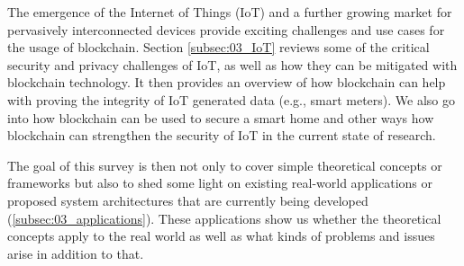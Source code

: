 The emergence of the Internet of Things (IoT) and a further growing market for pervasively interconnected devices provide exciting challenges and use cases for the usage of blockchain. Section \ref{subsec:03_IoT} reviews some of the critical security and privacy challenges of IoT, as well as how they can be mitigated with blockchain technology. It then provides an overview of how blockchain can help with proving the integrity of IoT generated data (e.g., smart meters). We also go into how blockchain can be used to secure a smart home and other ways how blockchain can strengthen the security of IoT in the current state of research.

The goal of this survey is then not only to cover simple theoretical concepts or frameworks but also to shed some light on existing real-world applications or proposed system architectures that are currently being developed (\ref{subsec:03_applications}). These applications show us whether the theoretical concepts apply to the real world as well as what kinds of problems and issues arise in addition to that.
